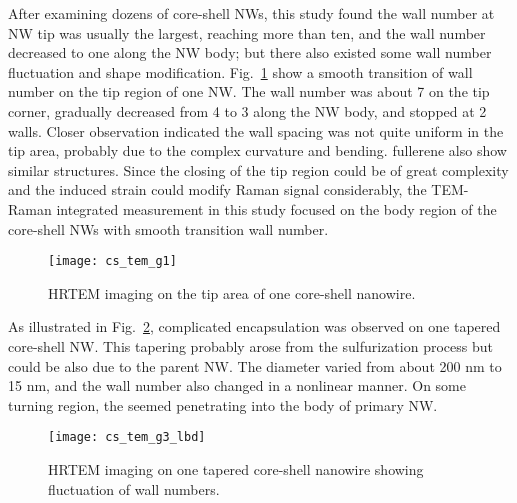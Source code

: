 After examining dozens of core-shell NWs, this study found the  wall number at NW tip was usually the largest, reaching more than ten, and the wall number decreased to one along the NW body; but there also existed some wall number fluctuation and shape modification. Fig.~\ref{fig:ch5ws2tem3} show a smooth transition of  wall number on the tip region of one NW. The wall number was about 7 on the tip corner, gradually decreased from 4 to 3 along the NW body, and stopped at 2 walls. Closer observation indicated the wall spacing was not quite uniform in the tip area, probably due to the complex curvature and bending.  fullerene also show similar structures. Since the closing of the tip region could be of great complexity and the induced strain could modify Raman signal considerably, the TEM-Raman integrated measurement in this study focused on the body region of the core-shell NWs with smooth transition wall number.
\begin{figure}[htb]
\centering
\texttt{[image: cs\_tem\_g1]}
\caption[HRTEM imaging on the tip area of one core-shell nanowire]{HRTEM imaging on the tip area of one core-shell nanowire.}
\label{fig:ch5ws2tem3}
\end{figure}
As illustrated in Fig.~\ref{fig:ch5ws2tem4}, complicated  encapsulation was observed on one tapered core-shell NW. This tapering probably arose from the sulfurization process but could be also due to the parent  NW. The diameter varied from about 200 nm to 15 nm, and the  wall number also changed in a nonlinear manner. On some turning region, the  seemed penetrating into the body of primary  NW. 
\begin{figure}[htb]
\centering
\texttt{[image: cs\_tem\_g3\_lbd]}
\caption[HRTEM imaging on one tapered core-shell nanowire]{HRTEM imaging on one tapered core-shell nanowire showing fluctuation of wall numbers.}
\label{fig:ch5ws2tem4}
\end{figure}

